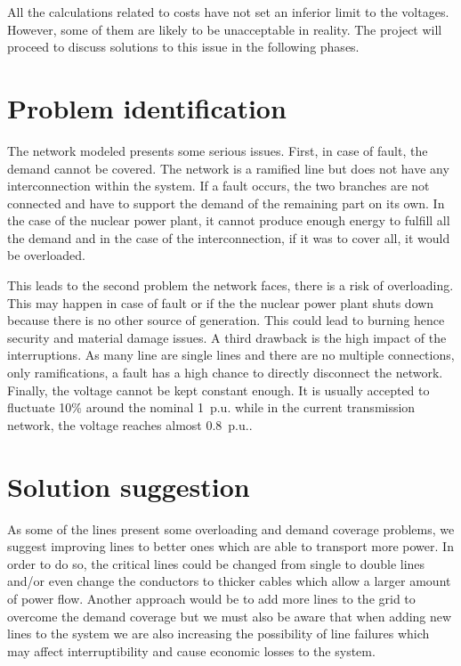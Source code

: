 All the calculations related to costs have not set an inferior limit to the voltages. However, some of them are likely to be unacceptable in reality. The project will proceed to discuss solutions to this issue in the following phases. 

\section{Problem identification}
The network modeled presents some serious issues. First, in case of fault, the demand cannot be covered. The network is a ramified line but does not have any interconnection within the system. If a fault occurs, the two branches are not connected and have to support the demand of the remaining part on its own. In the case of the nuclear power plant, it cannot produce enough energy to fulfill all the demand and in the case of the interconnection, if it was to cover all, it would be overloaded. 

This leads to the second problem the network faces, there is a risk of overloading. This may happen in case of fault or if the the nuclear power plant shuts down because there is no other source of generation. This could lead to burning hence security and material damage issues. A third drawback is the high impact of the interruptions. As many line are single lines and there are no multiple connections, only ramifications, a fault has a high chance to directly disconnect the network. Finally, the voltage cannot be kept constant enough. It is usually accepted to fluctuate 10\% around the nominal 1~p.u. while in the current transmission network, the voltage reaches almost 0.8~p.u..

\section{Solution suggestion}
As some of the lines present some overloading and demand coverage problems, we suggest improving lines to better ones which are able to transport more power. In order to do so, the critical lines could be changed from single to double lines and/or even change the conductors to thicker cables which allow a larger amount of power flow. Another approach would be to add more lines to the grid to overcome the demand coverage but we must also be aware that when adding new lines to the system we are also increasing the possibility of line failures which may affect interruptibility and cause economic losses to the system.

